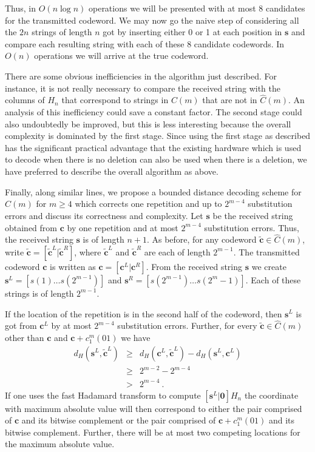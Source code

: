 Thus, in $O(n \log n)$ operations we will be presented with at
most $8$ candidates for the transmitted codeword. We may now go
the naive step of considering all the $2n$ strings of length $n$
got by inserting either 0 or 1 at each position in $\mathbf{s}$
and compare each resulting string with each of these $8$ candidate
codewords. In $O(n)$ operations we will arrive at the true
codeword.

There are some obvious inefficiencies in the algorithm just
described. For instance, it is not really necessary to compare the
received string with the columns of $H_n$ that correspond to
strings in $C(m)$ that are not in $\hat{C}(m)$. An analysis of
this inefficiency could save a constant factor. The second stage
could also undoubtedly be improved, but this is less interesting
because the overall complexity is dominated by the first stage.
Since using the first stage as described has the significant
practical advantage that the existing hardware which is used to
decode when there is no deletion can also be used when there is a
deletion, we have preferred to describe the overall algorithm as
above.

Finally, along similar lines, we propose a bounded distance
decoding scheme for ${\hat C}(m)$ for $m \ge 4$ which corrects one
repetition and up to $2^{m-4}$ substitution errors and discuss its
correctness and complexity. Let $\mathbf{s}$ be the received
string obtained from $\mathbf{c}$ by one repetition and at most
$2^{m-4}$ substitution errors. Thus, the received string
$\mathbf{s}$ is of length $n+1$. As before, for any codeword
$\tilde{\mathbf{c}} \in \hat{C}(m)$, write $\tilde{\mathbf{c}} =
\left[ \tilde{\mathbf{c}}^L | \tilde{\mathbf{c}}^R \right]$, where
$\tilde{\mathbf{c}}^L$ and $\tilde{\mathbf{c}}^R$ are each of
length $2^{m-1}$. The transmitted codeword $\mathbf{c}$ is written
as $\mathbf{c} = \left[ \mathbf{c}^L | \mathbf{c}^R \right]$. From
the received string $\mathbf{s}$ we create $\mathbf{s}^L = \left[
s(1) \ldots s(2^{m-1}) \right]$ and $\mathbf{s}^R = \left[
s(2^{m-1}) \ldots s(2^m -1) \right]$. Each of these strings is of
length $2^{m-1}$.

If the location of the repetition is in the second half of the
codeword, then $\mathbf{s}^L$ is got from $\mathbf{c}^L$ by at
most  $2^{m-4}$ substitution errors. Further, for every
$\tilde{\mathbf{c}} \in \hat{C}(m)$ other than $\mathbf{c}$ and
$\mathbf{c} + c_1^m(01)$ we have
\begin{eqnarray*}
d_H(\mathbf{s}^L, \tilde{\mathbf{c}}^L) &\ge &d_H(\mathbf{c}^L,
\tilde{\mathbf{c}}^L) - d_H(\mathbf{s}^L, \mathbf{c}^L) \\{}&\ge&
2^{m-2} - 2^{m-4} \\{}&>& 2^{m-4}~.
\end{eqnarray*}
If one uses the fast Hadamard transform to compute $\left[
\mathbf{s}^L | \mathbf{0} \right] H_n$ the coordinate with maximum
absolute value will then correspond to either the pair comprised
of $\mathbf{c}$ and its bitwise complement or the pair comprised
of $\mathbf{c} + c_1^m(01)$ and its bitwise complement. Further,
there will be at most two competing locations for the maximum
absolute value.

